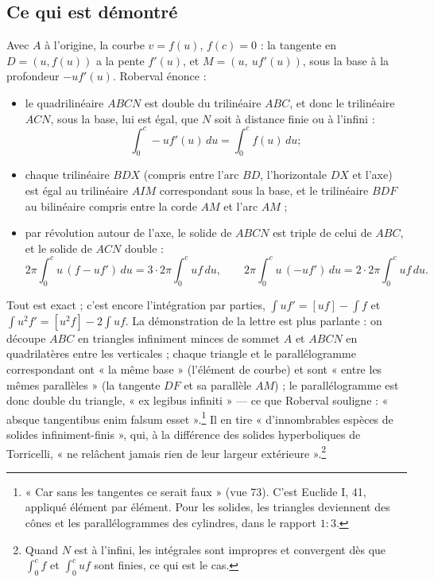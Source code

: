 \documentclass[11pt,a4paper]{article}
\begin{document}
\subsection*{Ce qui est démontré}

Avec $A$ à l'origine, la courbe $v=f(u)$, $f(c)=0$ : la tangente en $D=(u,f(u))$ a
la pente $f'(u)$, et $M = (u,\ u f'(u))$, sous la base à la profondeur $-uf'(u)$.
Roberval énonce :

\begin{itemize}
  \item le quadrilinéaire $ABCN$ est double du trilinéaire $ABC$, et donc le
    trilinéaire $ACN$, sous la base, lui est égal, que $N$ soit à distance finie
    ou à l'infini :
    \[
    \int_0^c -u f'(u)\,du = \int_0^c f(u)\,du ;
    \]
  \item chaque trilinéaire $BDX$ (compris entre l'arc $BD$, l'horizontale $DX$ et
    l'axe) est égal au trilinéaire $AIM$ correspondant sous la base, et le
    trilinéaire $BDF$ au bilinéaire compris entre la corde $AM$ et
    l'arc $AM$ ;
  \item par révolution autour de l'axe, le solide de $ABCN$ est triple de celui
    de $ABC$, et le solide de $ACN$ double :
    \[
    2\pi\!\int_0^c u\,(f-uf')\,du = 3\cdot 2\pi\!\int_0^c u f\,du,\qquad
    2\pi\!\int_0^c u\,(-uf')\,du = 2\cdot 2\pi\!\int_0^c uf\,du .
    \]
\end{itemize}

Tout est exact ; c'est encore l'intégration par parties, $\int u f' =
[uf]-\int f$ et $\int u^2f' = [u^2f]-2\int uf$. La démonstration de la lettre
est plus parlante : on découpe $ABC$ en triangles infiniment minces de sommet $A$
et $ABCN$ en quadrilatères entre les verticales ; chaque triangle et le
parallélogramme correspondant ont « la même base » (l'élément de courbe) et sont
« entre les mêmes parallèles » (la tangente $DF$ et sa parallèle $AM$) ; le
parallélogramme est donc double du triangle, « ex legibus infiniti » — ce que
Roberval souligne : « absque tangentibus enim falsum esset ».\footnote{« Car sans
les tangentes ce serait faux » (vue 73). C'est Euclide I, 41, appliqué élément par
élément. Pour les solides, les triangles deviennent des cônes et les
parallélogrammes des cylindres, dans le rapport $1:3$.} Il en tire
« d'innombrables espèces de solides infiniment-finis », qui, à la différence des
solides hyperboliques de Torricelli, « ne relâchent jamais rien de leur largeur
extérieure ».\footnote{Quand $N$ est à l'infini, les intégrales sont impropres et
convergent dès que $\int_0^c f$ et $\int_0^c uf$ sont finies, ce qui est le cas.}
\end{document}
